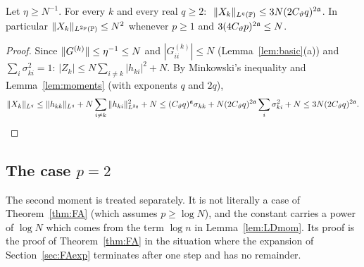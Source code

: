 \begin{lemma}\label{lem:FAcrude}
Let $\eta\ge N^{-1}$. For every $k$ and every real $q\ge2$: $\ \|X_k\|_{L^q(\mathbb{P})}\le3N(2C_\vartheta q)^{2\mathfrak{a}}$. In particular $\|X_k\|_{L^{2p}(\mathbb{P})}\le N^2$ whenever $p\ge1$ and $3(4C_\vartheta p)^{2\mathfrak{a}}\le N$.
\end{lemma}
\begin{proof}
Since $\|G^{(k)}\|\le\eta^{-1}\le N$ and $|G^{(k)}_{ii}|\le N$ (Lemma~\ref{lem:basic}(a)) and $\sum_i\sigma_{ki}^2=1$: $|Z_k|\le N\sum_{i\ne k}|h_{ki}|^2+N$. By Minkowski's inequality and Lemma~\ref{lem:moments} (with exponents $q$ and $2q$),
\[
 \|X_k\|_{L^q}\le\|h_{kk}\|_{L^q}+N\sum_{i\ne k}\|h_{ki}\|_{L^{2q}}^2+N\le(C_\vartheta q)^{\mathfrak{a}}\sigma_{kk}+N(2C_\vartheta q)^{2\mathfrak{a}}\sum_i\sigma_{ki}^2+N\le3N(2C_\vartheta q)^{2\mathfrak{a}}.\qedhere
\]
\end{proof}

\subsection{The case $p=2$}\label{sec:FAtwo}
The second moment is treated separately. It is not literally a case of Theorem~\ref{thm:FA} (which assumes $p\ge\log N$), and the constant carries a power of $\log N$ which comes from the term $\log n$ in Lemma~\ref{lem:LDmom}.
Its proof is the proof of Theorem~\ref{thm:FA} in the situation where the expansion of Section~\ref{sec:FAexp} terminates after one step and has no remainder.

